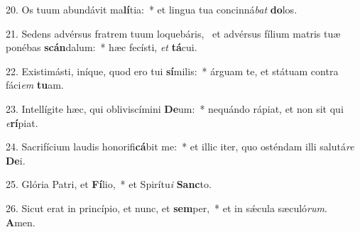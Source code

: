 20. Os tuum abundávit ma\textbf{lí}tia:~*  et lingua tua concinná\textit{bat} \textbf{do}los.\

21. Sedens advérsus fratrem tuum loquebáris, \dag\  et advérsus fílium matris tuæ ponébas \textbf{scán}dalum:~*  hæc fecísti, \textit{et} \textbf{tá}cui.\

22. Existimásti, iníque, quod ero tui \textbf{sí}milis:~*  árguam te, et státuam contra fáci\textit{em} \textbf{tu}am.\

23. Intellígite hæc, qui obliviscímini \textbf{De}um:~*  nequándo rápiat, et non sit qui \textit{e}\textbf{rí}piat.\

24. Sacrifícium laudis honorifi\textbf{cá}bit me:~*  et illic iter, quo osténdam illi salutá\textit{re} \textbf{De}i.\

25. Glória Patri, et \textbf{Fí}lio,~*  et Spirítu\textit{i} \textbf{Sanc}to.\

26. Sicut erat in princípio, et nunc, et \textbf{sem}per,~*  et in sǽcula sæculó\textit{rum}. \textbf{A}men.\

